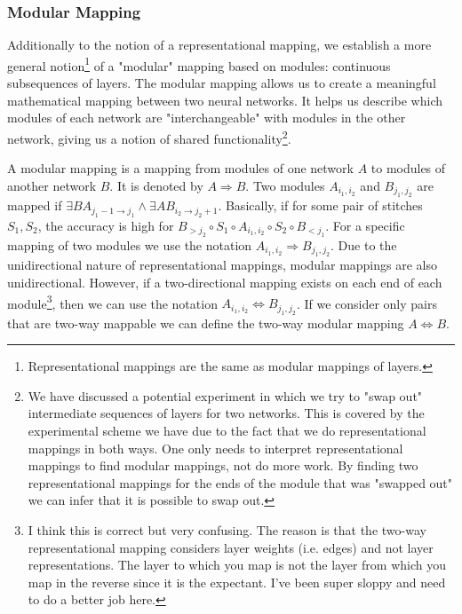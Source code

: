 \documentclass{article} %
\begin{document}
\subsubsection*{Modular Mapping}
Additionally to the notion of a representational mapping, we establish a more general notion\footnote{Representational mappings are the same as modular mappings of layers.} of
a "modular" mapping based on modules: continuous subsequences of layers. The modular mapping allows us to
create a meaningful mathematical mapping between two neural networks. It helps us describe which modules
of each network are "interchangeable" with modules in the other network, giving us a notion of shared functionality\footnote{We have discussed a potential experiment in which we try to "swap out" intermediate sequences of layers for two networks. This is covered by the experimental scheme we have due to the fact that we do representational mappings in both ways. One only needs to interpret representational mappings to find modular mappings, not do more work. By finding two representational mappings for the ends of the module that was "swapped out" we can infer that it is possible to swap out.}.

A modular mapping is a mapping from modules of one network \(A\) to modules of another network \(B\). It is denoted by \(A \Rightarrow B\). Two modules \(A_{i_1,i_2}\) and \(B_{j_1, j_2}\) are mapped
if \(\exists BA_{j_1-1 \rightarrow j_1} \land \exists AB_{i_2 \rightarrow j_2+1}\). Basically, if for some pair of stitches \(S_1, S_2\), the accuracy is high for \(B_{>j_2} \circ S_1 \circ A_{i_1,i_2} \circ S_2 \circ B_{<j_1}\).
For a specific mapping of two modules we use the notation \(A_{i_1, i_2} \Rightarrow B_{j_1, j_2} \). Due to the unidirectional nature of representational mappings, modular mappings are also unidirectional. However, if a two-directional
mapping exists on each end of each module\footnote{I think this is correct but very confusing. The reason is that the two-way representational mapping considers layer weights (i.e. edges) and not layer representations. The layer to which you map is not the layer from which you map in the reverse since it is the expectant. I've been super sloppy and need to do a better job here.}, then we can use the notation \(A_{i_1, i_2} \Leftrightarrow B_{j_1, j_2}\). If we consider only pairs that are two-way mappable we can define the two-way modular mapping \(A \Leftrightarrow B\).
\end{document}
